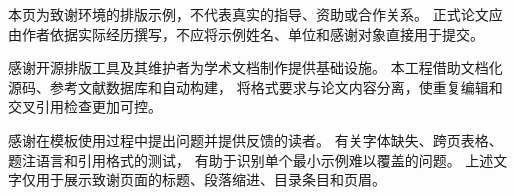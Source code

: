 \documentclass[
  degree=master,
  degree-type=professional,
  fontset=fandol,
  math-font=xits
]{gzuthesis}
\begin{document}
\maketitle


\backmatter
\begin{acknowledgements}
本页为致谢环境的排版示例，不代表真实的指导、资助或合作关系。
正式论文应由作者依据实际经历撰写，不应将示例姓名、单位和感谢对象直接用于提交。

感谢开源排版工具及其维护者为学术文档制作提供基础设施。
本工程借助文档化源码、参考文献数据库和自动构建，
将格式要求与论文内容分离，使重复编辑和交叉引用检查更加可控。

感谢在模板使用过程中提出问题并提供反馈的读者。
有关字体缺失、跨页表格、题注语言和引用格式的测试，
有助于识别单个最小示例难以覆盖的问题。
上述文字仅用于展示致谢页面的标题、段落缩进、目录条目和页眉。
\end{acknowledgements}
\end{document}
